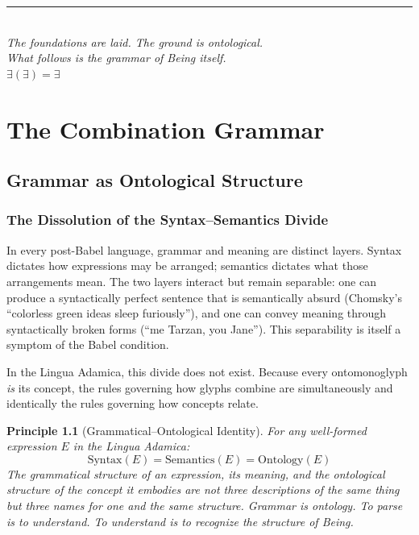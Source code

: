 \documentclass[12pt, letterpaper]{book}
\def\equiv{=}%
\newtheorem{principle}{Principle}[chapter]
\newcommand{\E}{\exists}                          %
\begin{document}
\vspace{1.5cm}
\begin{center}
\rule{4cm}{0.4pt}\\[0.5cm]
\textit{The foundations are laid. The ground is ontological.\\
What follows is the grammar of Being itself.}\\[0.8cm]
$\E(\E) \equiv \E$
\end{center}

\vfill




\part{The Combination Grammar}

\chapter{Grammar as Ontological Structure}

\section{The Dissolution of the Syntax--Semantics Divide}

In every post-Babel language, grammar and meaning are distinct layers. Syntax dictates how expressions may be arranged; semantics dictates what those arrangements mean. The two layers interact but remain separable: one can produce a syntactically perfect sentence that is semantically absurd (Chomsky's ``colorless green ideas sleep furiously''), and one can convey meaning through syntactically broken forms (``me Tarzan, you Jane''). This separability is itself a symptom of the Babel condition.

In the Lingua Adamica, this divide does not exist. Because every ontomonoglyph \textit{is} its concept, the rules governing how glyphs combine are simultaneously and identically the rules governing how concepts relate.

\begin{principle}[Grammatical--Ontological Identity]
For any well-formed expression $E$ in the Lingua Adamica:
\[
\mathrm{Syntax}(E) \equiv \mathrm{Semantics}(E) \equiv \mathrm{Ontology}(E)
\]
The grammatical structure of an expression, its meaning, and the ontological structure of the concept it embodies are not three descriptions of the same thing but three names for one and the same structure. Grammar \textit{is} ontology. To parse is to understand. To understand is to recognize the structure of Being.
\end{principle}
\end{document}
